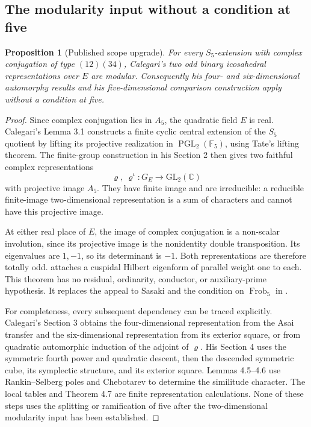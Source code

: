 \documentclass[11pt]{article}
\newtheorem{proposition}[theorem]{Proposition}
\theoremstyle{definition}
\theoremstyle{remark}
\newcommand{\C}{\mathbb C}
\newcommand{\GL}{\mathrm{GL}}
\numberwithin{equation}{section}
\begin{document}
\subsection{The modularity input without a condition at five}\label{sec:moderninput}

\begin{proposition}[Published scope upgrade]\label{prop:scopeupgrade}
For every $S_5$-extension with complex conjugation of type $(12)(34)$, Calegari's two odd binary icosahedral representations over $E$ are modular. Consequently his four- and six-dimensional automorphy results and his five-dimensional comparison construction apply without a condition at five.
\end{proposition}

\begin{proof}
Since complex conjugation lies in $A_5$, the quadratic field $E$ is real. Calegari's Lemma 3.1 constructs a finite cyclic central extension of the $S_5$ quotient by lifting its projective realization in $\operatorname{PGL}_2(\mathbb F_5)$, using Tate's lifting theorem. The finite-group construction in his Section 2 then gives two faithful complex representations
\[
\varrho,\ \varrho^\iota:G_E\longrightarrow\GL_2(\C)
\]
with projective image $A_5$. They have finite image and are irreducible: a reducible finite-image two-dimensional representation is a sum of characters and cannot have this projective image.

At either real place of $E$, the image of complex conjugation is a non-scalar involution, since its projective image is the nonidentity double transposition. Its eigenvalues are $1,-1$, so its determinant is $-1$. Both representations are therefore totally odd. \citet[Th\'eor\`eme 0.3]{pillonistroh} attaches a cuspidal Hilbert eigenform of parallel weight one to each. This theorem has no residual, ordinarity, conductor, or auxiliary-prime hypothesis. It replaces the appeal to Sasaki and the condition on $\operatorname{Frob}_5$ in \citet[Lemma 3.2]{calegari}.

For completeness, every subsequent dependency can be traced explicitly. Calegari's Section 3 obtains the four-dimensional representation from the Asai transfer and the six-dimensional representation from its exterior square, or from quadratic automorphic induction of the adjoint of $\varrho$. His Section 4 uses the symmetric fourth power and quadratic descent, then the descended symmetric cube, its symplectic structure, and its exterior square. Lemmas 4.5--4.6 use Rankin--Selberg poles and Chebotarev to determine the similitude character. The local tables and Theorem 4.7 are finite representation calculations. None of these steps uses the splitting or ramification of five after the two-dimensional modularity input has been established.


\end{proof}
\end{document}
